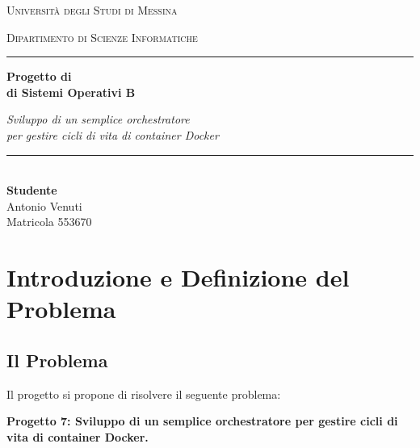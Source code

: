 \documentclass[12pt,a4paper]{article}
\begin{document}
\begin{titlepage}
    \centering
    {\Large\textsc{Università degli Studi di Messina}\par}
    \vspace{0.2cm}
    {\large\textsc{Dipartimento di Scienze Informatiche}\par}

    \vspace{0.5cm}

    \rule{0.8\textwidth}{0.5pt}

    \vspace{2.5cm}

    {\Huge\bfseries
    Progetto di\\[0.3cm]
    di Sistemi Operativi B
    \par}

    \vspace{1.5cm}

    {\Large
    \textit{Sviluppo di un semplice orchestratore}\\[0.3cm]
    \textit{per gestire cicli di vita di container Docker}
    \par}

    \vfill

    \begin{minipage}{0.65\textwidth}
        \centering
        \rule{0.6\textwidth}{0.4pt}\\[0.4cm]
        {\large
        \textbf{Studente}\\[0.2cm]
        Antonio Venuti\\
        Matricola 553670
        }
    \end{minipage}

    \vfill

\end{titlepage}

\newpage

\tableofcontents
\newpage

\section{Introduzione e Definizione del Problema}
\subsection{Il Problema}
Il progetto si propone di risolvere il seguente problema:

\textbf{Progetto 7: Sviluppo di un semplice orchestratore per gestire cicli di vita di container Docker.}
\end{document}
